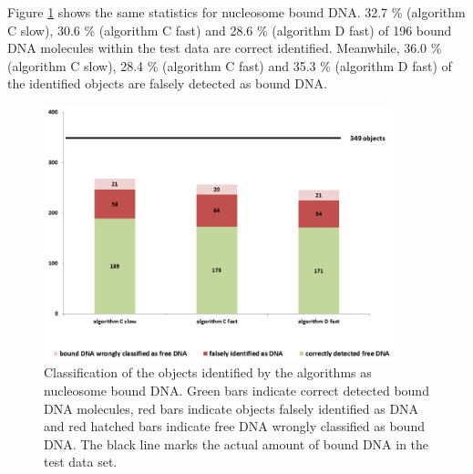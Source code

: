 \documentclass{article}
\begin{document}
Figure \ref{fig: validation3} shows the same statistics for nucleosome bound DNA. 32.7 \% (algorithm C slow), 30.6 \% (algorithm C fast) and 28.6 \% (algorithm D fast) of 196 bound DNA molecules within the test data are correct identified. Meanwhile, 36.0 \% (algorithm C slow), 28.4 \% (algorithm C fast) and 35.3 \% (algorithm D fast) of the identified objects are falsely detected as bound DNA.
%
\begin{figure}[!htb]
	\begin{center}
		\includegraphics[width = 0.9\textwidth]{validation3}
	\end{center}
	\caption{Classification of the objects identified by the algorithms as nucleosome bound DNA. Green bars indicate correct detected bound DNA molecules, red bars indicate objects falsely identified as DNA and red hatched bars indicate free DNA wrongly classified as bound DNA. The black line marks the actual amount of bound DNA in the test data set.}
	\label{fig: validation3} %
\end{figure}
\end{document}
